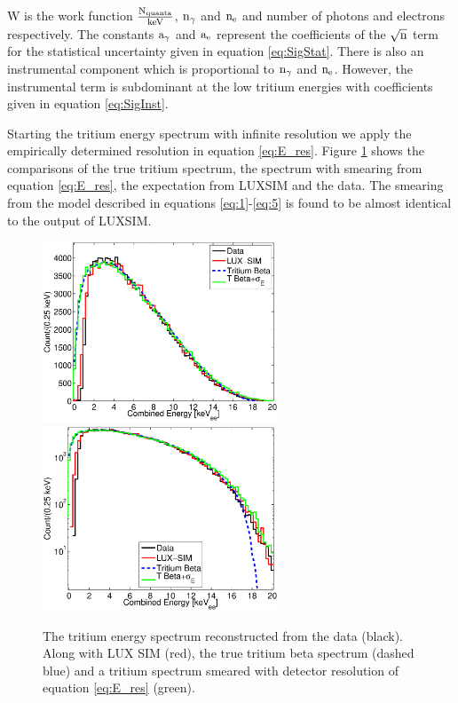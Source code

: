 \noindent W is the work function $\rm \frac{N_{quanta}}{keV}$, $\rm n_\gamma$ and $\rm n_e$ and number of photons and electrons respectively. The constants $\rm a_\gamma$ and $\rm a_e$ represent the coefficients of the $\rm \sqrt{n}$ term for the statistical uncertainty given in equation \ref{eq:SigStat}. There is also an instrumental component which is proportional to $\rm n_\gamma$ and $\rm n_e$. However, the instrumental term is subdominant at the low tritium energies with coefficients given in equation \ref{eq:SigInst}.

Starting the tritium energy spectrum with infinite resolution we apply the empirically determined resolution in equation \ref{eq:E_res}. Figure \ref{fig:E_spec} shows the comparisons of the true tritium spectrum, the spectrum with smearing from equation \ref{eq:E_res}, the expectation from LUXSIM and the data. The smearing from the model described in equations \ref{eq:1}-\ref{eq:5} is found to be almost identical to the output of LUXSIM.

\newpage

 \begin{figure}[h!]\centering
\includegraphics[width=70mm]{Chapter_Flucs/Figures/E_Spec/E_spec_compare_SIM.eps}
\includegraphics[width=70mm]{Chapter_Flucs/Figures/E_Spec/E_spec_compare_SIM_log_.eps}
\caption{The tritium energy spectrum reconstructed from the data (black). Along with LUX SIM (red), the true tritium beta spectrum (dashed blue) and a tritium spectrum smeared with detector resolution of equation \ref{eq:E_res} (green). }
\label{fig:E_spec}
\end{figure}

